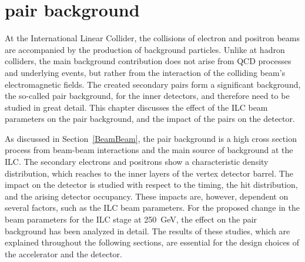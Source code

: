 \chapter{\positron\electron pair background}
\label{PairBkg}

\begin{chapterabstract}
 At the International Linear Collider, the collisions of electron and positron beams are accompanied by the production of background particles.
 Unlike at hadron colliders, the main background contribution does not arise from QCD processes and underlying events, but rather from the interaction of the colliding beam's electromagnetic fields.
 The created secondary \positron\electron pairs form a significant background, the so-called pair background, for the inner detectors, and therefore need to be studied in great detail.
 This chapter discusses the effect of the ILC beam parameters on the pair background, and the impact of the \positron\electron pairs on the \sid detector.
\end{chapterabstract}

As discussed in Section~\ref{BeamBeam}, the pair background is a high cross section process from beam-beam interactions and the main source of background at the ILC.
The secondary electrons and positrons show a characteristic density distribution, which reaches to the inner layers of the \sid vertex detector barrel.
The impact on the \sid detector is studied with respect to the timing, the hit distribution, and the arising detector occupancy.
These impacts are, however, dependent on several factors, such as the ILC beam parameters.
For the proposed change in the beam parameters for the ILC stage at \SI{250}{\GeV}, the effect on the pair background has been analyzed in detail.
The results of these studies, which are explained throughout the following sections, are essential for the design choices of the accelerator and the \sid detector.

